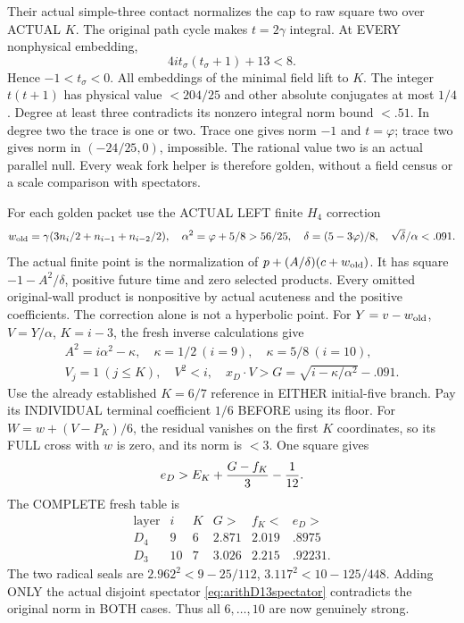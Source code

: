 Their actual simple-three contact normalizes the
cap to raw square two over ACTUAL \(K\).
The original path cycle makes \(t=2\gamma\) integral.
At EVERY nonphysical embedding,
\[
                     4it_\sigma(t_\sigma+1)+13<8 .
\]
Hence \(-1<t_\sigma<0\).
All embeddings of the minimal field lift to \(K\).
The integer \(t(t+1)\) has physical value \(<204/25\)
and other absolute conjugates at most \(1/4\).
Degree at least three contradicts its nonzero
integral norm bound \(<.51\).
In degree two the trace is one or two.
Trace one gives norm \(-1\) and \(t=\varphi\);
trace two gives norm in \((-24/25,0)\), impossible.
The rational value two is an actual parallel null.
Every weak fork helper is therefore golden,
without a field census or a scale comparison
with spectators.

For each golden packet use the ACTUAL LEFT finite
\(H_4\) correction
\[
 w_{\rm old}=\gamma(3n_i/2+n_{i-1}+n_{i-2}/2),\quad
 \alpha^2=\varphi+5/8>56/25,\quad
 \delta=(5-3\varphi)/8,\quad \sqrt\delta/\alpha<.091 .
\]
The actual finite point is the normalization of
\(p+(A/\delta)(c+w_{\rm old})\).
It has square \(-1-A^2/\delta\), positive future
time and zero selected products.
Every omitted original-wall product is nonpositive
by actual acuteness and the positive coefficients.
The correction alone is not a hyperbolic point.
For \(Y=v-w_{\rm old}\), \(V=Y/\alpha\), \(K=i-3\),
the fresh inverse calculations give
\[
 \begin{gathered}
 A^2=i\alpha^2-\kappa,\quad
 \kappa=1/2\ (i=9),\quad \kappa=5/8\ (i=10),\\
 V_j=1\ (j\le K),\quad V^2<i,\quad
 x_D\cdot V>G=\sqrt{i-\kappa/\alpha^2}-.091 .
 \end{gathered}
\]
Use the already established \(K=6/7\) reference
in EITHER initial-five branch.
Pay its INDIVIDUAL terminal coefficient \(1/6\)
BEFORE using its floor.
For \(W=w+(V-P_K)/6\), the residual vanishes
on the first \(K\) coordinates, so its FULL
cross with \(w\) is zero, and its norm is \(<3\).
One square gives
\[
                         e_D>E_K+{G-f_K\over3}-{1\over12}.
\]
The COMPLETE fresh table is
\[
\begin{array}{c|c|c|c|c|c}
 \text{layer}&i&K&G>&f_K<&e_D>\\ \hline
 D_4&9&6&2.871&2.019&.8975\\
 D_3&10&7&3.026&2.215&.92231 .
\end{array}
\]
The two radical seals are
\(2.962^2<9-25/112\),
\(3.117^2<10-125/448\).
Adding ONLY the actual disjoint spectator
\eqref{eq:arithD13spectator} contradicts the
original norm in BOTH cases.
Thus all \(6,\ldots,10\) are now genuinely strong.

